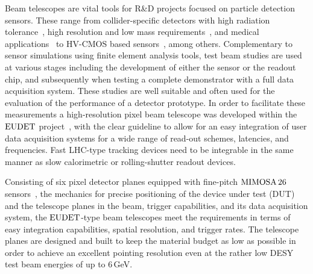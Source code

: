 

Beam telescopes are vital tools for R\&D projects focused on particle detection sensors. 
These range from collider-specific detectors with high radiation tolerance~\cite{1748-0221-9-12-C12001,1748-0221-9-12-C12029},
 high resolution and low mass requirements~\cite{1748-0221-10-03-C03044}, and medical applications~\cite{Ballabriga2011S15} to HV-CMOS based sensors~\cite{1748-0221-7-08-C08002}, among others.
Complementary to sensor simulations using finite element analysis tools, test beam studies are used at various stages including the development of either the sensor or the readout chip,
 and subsequently when testing a complete demonstrator with a full data acquisition system. 
These studies are well suitable and often used for the evaluation of the performance of a detector prototype. %
In order to facilitate these measurements a high-resolution pixel beam telescope was developed within the $\textrm{EUDET}$ project~\cite{ref:eudetreport200902},
 with the clear guideline to allow for an easy integration of user data acquisition systems for a wide range of read-out schemes, latencies, and frequencies. 
Fast LHC-type tracking devices need to be integrable in the same manner as slow calorimetric or rolling-shutter readout devices. 

Consisting of six pixel detector planes equipped with fine-pitch $\textrm{MIMOSA\,26}$ sensors~\cite{HuGuo2010480},
 the mechanics for precise positioning of the device under test (DUT) and the telescope planes in the beam, trigger capabilities, and its data acquisition system, 
 the $\textrm{EUDET}$-type beam telescopes meet the requirements in terms of easy integration capabilities, spatial resolution, and trigger rates. 
The telescope planes are designed and built to keep the material budget as low as possible in order to achieve an excellent pointing resolution
 even at the rather low DESY test beam energies of up to 6\,GeV.

